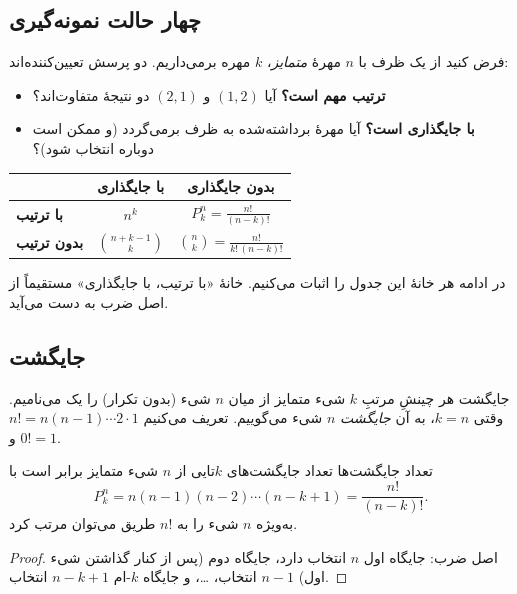 \subsection{چهار حالت نمونه‌گیری}

فرض کنید از یک ظرف با $n$ مهرهٔ \emph{متمایز}، $k$ مهره برمی‌داریم. دو پرسش تعیین‌کننده‌اند:
\begin{itemize}
  \item \textbf{ترتیب مهم است؟} آیا $(1,2)$ و $(2,1)$ دو نتیجهٔ متفاوت‌اند؟
  \item \textbf{با جایگذاری است؟} آیا مهرهٔ برداشته‌شده به ظرف برمی‌گردد (و ممکن است دوباره انتخاب شود)؟
\end{itemize}

\begin{center}
\renewcommand{\arraystretch}{1.6}
\begin{tabular}{>{\semifont}l|c|c}
 & \textbf{با جایگذاری} & \textbf{بدون جایگذاری} \\
\hline
\textbf{با ترتیب} & $n^k$ & $\displaystyle P^n_k=\frac{n!}{(n-k)!}$ \\
\hline
\textbf{بدون ترتیب} & $\displaystyle \binom{n+k-1}{k}$ & $\displaystyle \binom{n}{k}=\frac{n!}{k!\,(n-k)!}$ \\
\end{tabular}
\end{center}

در ادامه هر خانهٔ این جدول را اثبات می‌کنیم. خانهٔ «با ترتیب، با جایگذاری» مستقیماً از اصل ضرب به دست می‌آید.

\subsection{جایگشت}

\begin{definition}{جایگشت}
هر چینشِ مرتبِ $k$ شیء متمایز از میان $n$ شیء (بدون تکرار) را یک  می‌نامیم. وقتی $k=n$، به آن \emph{جایگشت} $n$ شیء می‌گوییم. تعریف می‌کنیم $n!=n(n-1)\cdots 2\cdot 1$ و $0!=1$.
\end{definition}

\begin{theorem}{تعداد جایگشت‌ها}
تعداد جایگشت‌های $k$تایی از $n$ شیء متمایز برابر است با
\[ P^n_k = n(n-1)(n-2)\cdots(n-k+1)=\frac{n!}{(n-k)!}. \]
به‌ویژه $n$ شیء را به $n!$ طریق می‌توان مرتب کرد.
\end{theorem}

\begin{proof}
اصل ضرب: جایگاه اول $n$ انتخاب دارد، جایگاه دوم (پس از کنار گذاشتن شیء اول) $n-1$ انتخاب، \dots، و جایگاه $k$-ام $n-k+1$ انتخاب.
\end{proof}

